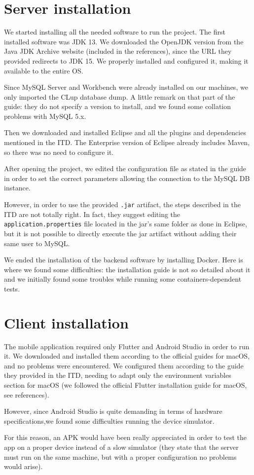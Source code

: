 \documentclass[a4paper,oneside,11pt]{book}
\begin{document}
    \section{Server installation}
    We started installing all the needed software to run the project. The first installed software was JDK 13. We downloaded the OpenJDK version from the Java JDK Archive website (included in the references), since the URL they provided redirects to JDK 15. We properly installed and configured it, making it available to the entire OS. \par
    Since MySQL Server and Workbench were already installed on our machines, we only imported the CLup database dump. A little remark on that part of the guide: they do not specify a version to install, and we found some collation problems with MySQL 5.x. \par
    Then we downloaded and installed Eclipse and all the plugins and dependencies mentioned in the ITD. The Enterprise version of Eclipse already includes Maven, so there was no need to configure it. \par
    After opening the project, we edited the configuration file as stated in the guide in order to set the correct parameters allowing the connection to the MySQL DB instance. \par
    However, in order to use the provided \texttt{.jar} artifact, the steps described in the ITD are not totally right. In fact, they suggest editing the \texttt{application.properties} file located in the jar’s same folder as done in Eclipse, but it is not possible to directly execute the jar artifact without adding their same user to MySQL. \par
    We ended the installation of the backend software by installing Docker. Here is where we found some difficulties: the installation guide is not so detailed about it and we initially found some troubles while running some containers-dependent tests.

\newpage
    \section{Client installation}
    The mobile application required only Flutter and Android Studio in order to run it. We downloaded and installed them according to the official guides for macOS, and no problems were encountered. We configured them according to the guide they provided in the ITD, needing to adapt only the environment variables section for macOS (we followed the official Flutter installation guide for macOS, see references). \par
    However, since Android Studio is quite demanding in terms of hardware specifications,we found some difficulties running the device simulator. \par
    For this reason, an APK would have been really appreciated in order to test the app on a proper device instead of a slow simulator (they state that the server must run on the same machine, but with a proper configuration no problems would arise).
\end{document}
